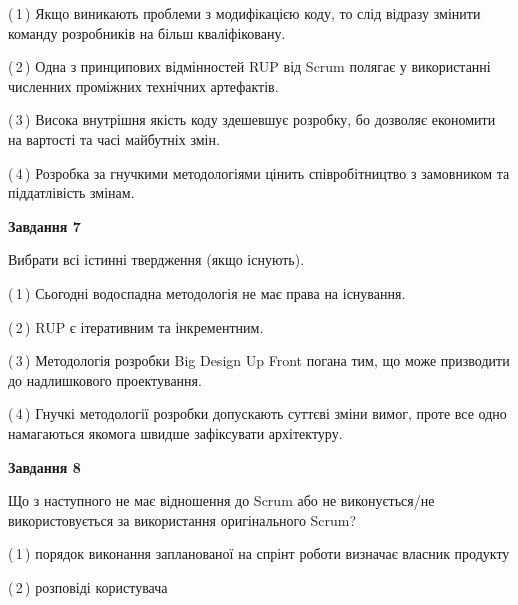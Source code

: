 \documentclass[10pt, ukrainian]{article}
\begin{document}
{\begin {large}
(\,1\,) Якщо виникають проблеми з модифікацією коду, то слід відразу змінити команду розробників на більш кваліфіковану.%



(\,2\,) Одна з принципових відмінностей RUP від Scrum полягає у використанні численних проміжних технічних артефактів. %



(\,3\,) Висока внутрішня якість коду здешевшує розробку, бо дозволяє економити на вартості та часі майбутніх змін. %



(\,4\,) Розробка за гнучкими методологіями цінить співробітництво з замовником та піддатлівість змінам. %


{\begin {center}\textbf{Завдання 7}\end {center}}\par
Вибрати всі істинні твердження (якщо існують).\par
\vspace{2mm}



(\,1\,) Сьогодні водоспадна методологія не має права на існування. %



(\,2\,) RUP є ітеративним та інкрементним.%



(\,3\,) Методологія розробки Big Design Up Front погана тим, що може призводити до надлишкового проектування. %



(\,4\,) Гнучкі методології розробки допускають суттєві зміни вимог, проте все одно намагаються якомога швидше зафіксувати архітектуру. %


{\begin {center}\textbf{Завдання 8}\end {center}}\par
Що з наступного не має відношення до Scrum або не виконується/не використовується за використання оригінального Scrum?\par
\vspace{2mm}



(\,1\,) порядок виконання запланованої на спрінт роботи визначає власник продукту%



(\,2\,) розповіді користувача%




\end{large}}
\end{document}
